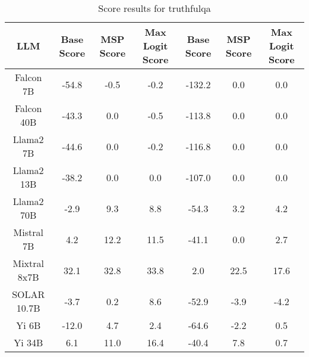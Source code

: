 \renewcommand\arraystretch{1.2}
\begin{table*}
\centering
\begin{tabular}{c|c|c|c|c|c|c}
LLM & Base Score & MSP Score & Max Logit Score & Base Score & MSP Score & Max Logit Score\\ \hline
Falcon 7B & -54.8 & -0.5 & -0.2 & -132.2 & 0.0 & 0.0\\
Falcon 40B & -43.3 & 0.0 & -0.5 & -113.8 & 0.0 & 0.0\\
Llama2 7B & -44.6 & 0.0 & -0.2 & -116.8 & 0.0 & 0.0\\
Llama2 13B & -38.2 & 0.0 & 0.0 & -107.0 & 0.0 & 0.0\\
Llama2 70B & -2.9 & 9.3 & 8.8 & -54.3 & 3.2 & 4.2\\
Mistral 7B & 4.2 & 12.2 & 11.5 & -41.1 & 0.0 & 2.7\\
Mixtral 8x7B & 32.1 & 32.8 & 33.8 & 2.0 & 22.5 & 17.6\\
SOLAR 10.7B & -3.7 & 0.2 & 8.6 & -52.9 & -3.9 & -4.2\\
Yi 6B & -12.0 & 4.7 & 2.4 & -64.6 & -2.2 & 0.5\\
Yi 34B & 6.1 & 11.0 & 16.4 & -40.4 & 7.8 & 0.7\\
\hline
\end{tabular}
\caption{Score results for truthfulqa}
\end{table*}
\label{tab:truthfulqa_score}
